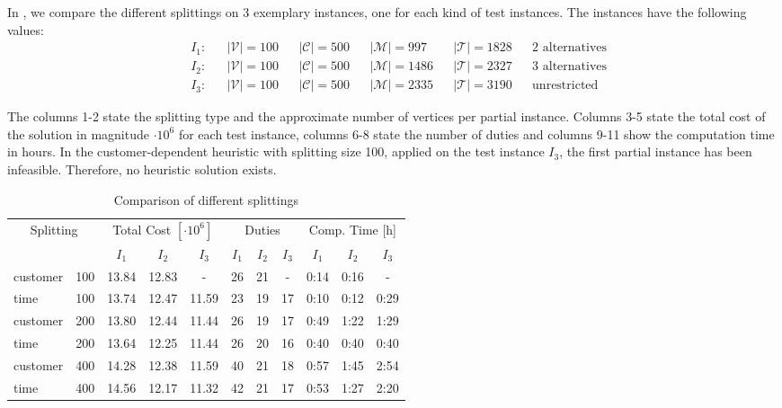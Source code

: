 In , we compare the different splittings on 3 exemplary instances, one for each kind of test instances. The instances have the following values:
\begin{align*}
	& I_1: && \vert\mathcal{V}\vert = 100 && \vert\mathcal{C}\vert = 500 && \vert\mathcal{M}\vert = 997 && \vert\mathcal{T}\vert = 1828 && 2 \text{ alternatives} \\
	& I_2: && \vert\mathcal{V}\vert = 100 && \vert\mathcal{C}\vert = 500 && \vert\mathcal{M}\vert = 1486 && \vert\mathcal{T}\vert = 2327 && 3 \text{ alternatives} \\
	& I_3: && \vert\mathcal{V}\vert = 100 && \vert\mathcal{C}\vert = 500 && \vert\mathcal{M}\vert = 2335 && \vert\mathcal{T}\vert = 3190 && \text{unrestricted}
\end{align*}

The columns 1-2 state the splitting type and the approximate number of vertices per partial instance. Columns 3-5 state the total cost of the solution in magnitude $\cdot 10^6$ for each test instance, columns 6-8 state the number of duties and columns 9-11 show the computation time in hours. In the customer-dependent heuristic with splitting size 100, applied on the test instance $I_3$, the first partial instance has been infeasible. Therefore, no heuristic solution exists.

\begin{table}[htb]
	\centering
	\begin{tabular}{lc|ccc|ccc|ccc}
		\toprule
		\multicolumn{2}{c}{Splitting} & \multicolumn{3}{c}{Total Cost $[\cdot 10^6]$} & \multicolumn{3}{c}{Duties} & \multicolumn{3}{c}{Comp. Time [h]} \\
		\cmidrule(r){3-11}
		&& $I_1$ & $I_2$ & $I_3$ & $I_1$ & $I_2$ & $I_3$ & $I_1$ & $I_2$ & $I_3$ \\
		\midrule
		customer & 100  &  13.84 & 12.83 &   -    &  26 & 21 & -   &  0:14 & 0:16 &  -   \\
		time     & 100  &  13.74 & 12.47 & 11.59  &  23 & 19 & 17  &  0:10 & 0:12 & 0:29 \\
		customer & 200  &  13.80 & 12.44 & 11.44  &  26 & 19 & 17  &  0:49 & 1:22 & 1:29 \\
		time     & 200  &  13.64 & 12.25 & 11.44  &  26 & 20 & 16  &  0:40 & 0:40 & 0:40 \\
		customer & 400  &  14.28 & 12.38 & 11.59  &  40 & 21 & 18  &  0:57 & 1:45 & 2:54 \\
		time     & 400  &  14.56 & 12.17 & 11.32  &  42 & 21 & 17  &  0:53 & 1:27 & 2:20 \\
		\bottomrule
	\end{tabular}
	\caption{Comparison of different splittings}
	\label{tab:results:splittings}
\end{table}

